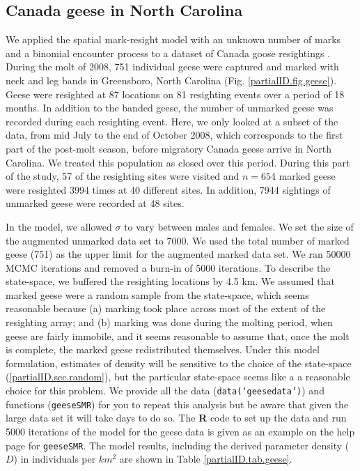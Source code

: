\subsection{Canada geese in North Carolina}
\label{partialID.subsec.geese}
We applied the spatial mark-resight model with an unknown number of
marks and a binomial encounter process to a dataset of Canada goose
resightings \citep{rutledge:2012}. During the molt of 2008, 751 individual geese were captured
and marked with neck and leg bands in Greensboro, North Carolina
(Fig. \ref{partialID.fig.geese}). Geese were resighted at 87 locations
on 81 resighting events over a period of 18 months. In addition to the
banded geese, the number of unmarked geese was recorded during each
resighting event. Here, we only looked at a subset of the data, from
mid July to the end of October 2008, which corresponds to the first
part of the post-molt season, before migratory Canada geese arrive in
North Carolina. We treated this population as closed over this period.
During this part of the study, 57 of the resighting sites were visited
and $n = 654$ marked geese were resighted 3994 times at 40 different
sites. In addition, 7944 sightings of unmarked geese were recorded at
48 sites.

In the model, we allowed $\sigma$ to vary between males and
females. We set the size of the augmented unmarked data set to 7000. We used the total number of marked geese (751) as the upper limit for the augmented marked data set. We ran 50000 MCMC iterations and removed a burn-in of 5000 iterations. To describe the state-space, we buffered the resighting locations by 4.5 km. We assumed that marked geese were a random sample from the state-space, which seems reasonable because (a) marking took place across most of the extent of the resighting array; and (b) marking was done during the molting period, when geese are fairly immobile, and it seems reasonable to assume that, once the molt is complete, the marked geese redistributed themselves.
Under this model formulation, estimates of density will be sensitive to the choice of the state-space (\ref{partialID.sec.random}), but the particular state-space seems like a a reasonable choice for this  problem.
We provide all the data ({\tt data(`geesedata')}) and functions ({\tt geeseSMR}) for you to repeat this analysis but be aware that given the large data set it will take days to do so. The {\bf R} code to set up the data and run 5000 iterations of the model for the geese data is given as an example on the help page for {\tt geeseSMR}. The model results, including the derived parameter density ($D$) in individuals per $km^2$ are shown in Table \ref{partialID.tab.geese}.


